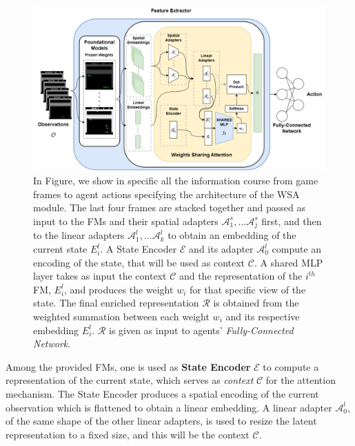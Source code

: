 \begin{figure}[ht]
    \begin{center}
        \includegraphics[width=1\textwidth]{images/wsa_main_architecture}
    \end{center}
    \caption{In Figure, we show in specific all the information course from game frames to agent actions specifying the architecture of the WSA module. The last four frames are stacked together and passed as input to the FMs and their spatial adapters $\mathcal{A}^{s}_1, \dots \mathcal{A}^{s}_j$ first, and then to the linear adapters $\mathcal{A}^{l}_1, \dots \mathcal{A}^{l}_k$ to obtain an embedding of the current state $E^l_i$. A State Encoder $\mathcal{E}$ and its adapter $\mathcal{A}^l_0$ compute an encoding of the state, that will be used as context $\mathcal{C}$. A shared MLP layer takes as input the context $\mathcal{C}$ and the representation of the $i^{th}$ FM, $E^l_i$, and produces the weight $w_i$ for that specific view of the state. The final enriched representation $\mathcal{R}$ is obtained from the weighted summation between each weight $w_i$ and its respective embedding $E^l_i$. $\mathcal{R}$ is given as input to agents' \textit{Fully-Connected Network}.}
    \label{fig:wsa_main_architecture}
\end{figure}


Among the provided FMs, one is used as \textbf{State Encoder} $\mathcal{E}$ to compute a representation of the current state, which serves as \textit{context} $\mathcal{C}$ for the attention mechanism.
The State Encoder produces a spatial encoding of the current observation which is flattened to obtain a linear embedding.
A linear adapter $\mathcal{A}^{l}_0$, of the same shape of the other linear adapters, is used to resize the latent representation to a fixed size, and this will be the context $\mathcal{C}$.

